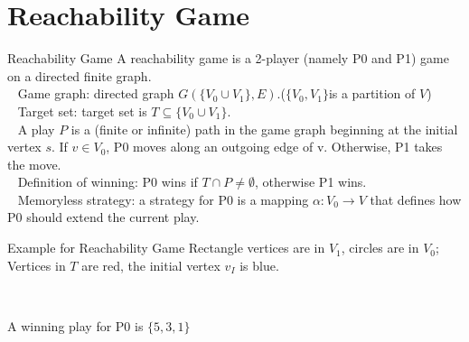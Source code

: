 \section{Reachability Game}
\begin{frame}{Reachability Game}
    A reachability game is a 2-player (namely P0 and P1) game on a directed finite graph.\\~
    Game graph: directed graph $G(\{V_0\cup V_1\},E)$.($\{V_0,V_1\}$is a partition of $V$) \\~
    Target set: target set is $T\subseteq \{V_0\cup V_1\}$.\\~
    A play $P$ is a (finite or infinite) path in the game graph beginning at the initial vertex $s$. If $v\in V_0$, P0 moves along an outgoing edge of v. Otherwise, P1 takes the move.\\~
    Definition of winning: P0 wins if $T\cap P \neq \emptyset$, otherwise P1 wins.\\~
    Memoryless strategy: a strategy for P0 is a mapping $\alpha : V_0 \rightarrow V$ that defines how P0 should extend the current play. 
\end{frame}
\begin{frame}{Example for Reachability Game}
Rectangle vertices are in $V_1$, circles are in $V_0$;\\
Vertices in $T$ are red, the initial vertex $v_I$ is blue.\\~


    \begin{columns}[c] %

        \begin{adjustbox}{width=\textwidth}
        \end{adjustbox}

        A winning play for P0 is $\{5,3,1\}$\\~
    \end{columns}
\end{frame}

